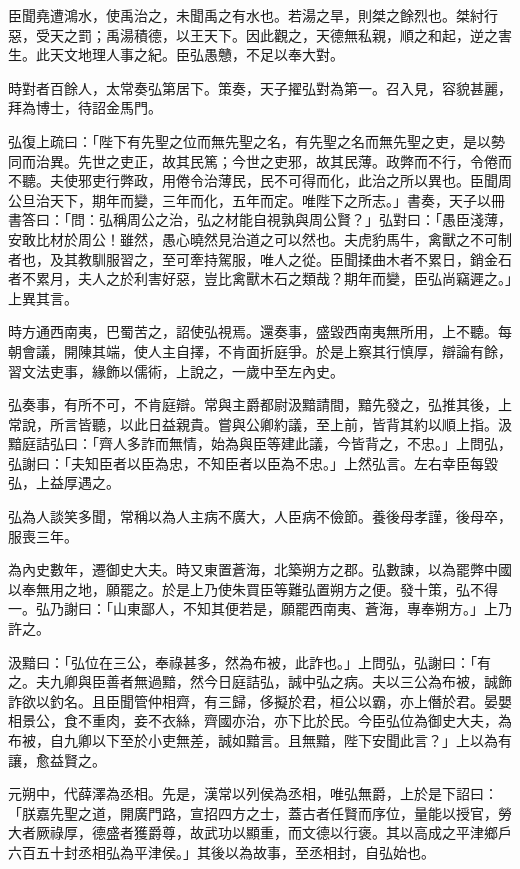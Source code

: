 \begin{pinyinscope}
臣聞堯遭鴻水，使禹治之，未聞禹之有水也。若湯之旱，則桀之餘烈也。桀紂行惡，受天之罰；禹湯積德，以王天下。因此觀之，天德無私親，順之和起，逆之害生。此天文地理人事之紀。臣弘愚戇，不足以奉大對。

時對者百餘人，太常奏弘第居下。策奏，天子擢弘對為第一。召入見，容貌甚麗，拜為博士，待詔金馬門。

弘復上疏曰：「陛下有先聖之位而無先聖之名，有先聖之名而無先聖之吏，是以勢同而治異。先世之吏正，故其民篤；今世之吏邪，故其民薄。政弊而不行，令倦而不聽。夫使邪吏行弊政，用倦令治薄民，民不可得而化，此治之所以異也。臣聞周公旦治天下，期年而變，三年而化，五年而定。唯陛下之所志。」書奏，天子以冊書答曰：「問：弘稱周公之治，弘之材能自視孰與周公賢？」弘對曰：「愚臣淺薄，安敢比材於周公！雖然，愚心曉然見治道之可以然也。夫虎豹馬牛，禽獸之不可制者也，及其教馴服習之，至可牽持駕服，唯人之從。臣聞揉曲木者不累日，銷金石者不累月，夫人之於利害好惡，豈比禽獸木石之類哉？期年而變，臣弘尚竊遲之。」上異其言。

時方通西南夷，巴蜀苦之，詔使弘視焉。還奏事，盛毀西南夷無所用，上不聽。每朝會議，開陳其端，使人主自擇，不肯面折庭爭。於是上察其行慎厚，辯論有餘，習文法吏事，緣飾以儒術，上說之，一歲中至左內史。

弘奏事，有所不可，不肯庭辯。常與主爵都尉汲黯請間，黯先發之，弘推其後，上常說，所言皆聽，以此日益親貴。嘗與公卿約議，至上前，皆背其約以順上指。汲黯庭詰弘曰：「齊人多詐而無情，始為與臣等建此議，今皆背之，不忠。」上問弘，弘謝曰：「夫知臣者以臣為忠，不知臣者以臣為不忠。」上然弘言。左右幸臣每毀弘，上益厚遇之。

弘為人談笑多聞，常稱以為人主病不廣大，人臣病不儉節。養後母孝謹，後母卒，服喪三年。

為內史數年，遷御史大夫。時又東置蒼海，北築朔方之郡。弘數諫，以為罷弊中國以奉無用之地，願罷之。於是上乃使朱買臣等難弘置朔方之便。發十策，弘不得一。弘乃謝曰：「山東鄙人，不知其便若是，願罷西南夷、蒼海，專奉朔方。」上乃許之。

汲黯曰：「弘位在三公，奉祿甚多，然為布被，此詐也。」上問弘，弘謝曰：「有之。夫九卿與臣善者無過黯，然今日庭詰弘，誠中弘之病。夫以三公為布被，誠飾詐欲以釣名。且臣聞管仲相齊，有三歸，侈擬於君，桓公以霸，亦上僭於君。晏嬰相景公，食不重肉，妾不衣絲，齊國亦治，亦下比於民。今臣弘位為御史大夫，為布被，自九卿以下至於小吏無差，誠如黯言。且無黯，陛下安聞此言？」上以為有讓，愈益賢之。

元朔中，代薛澤為丞相。先是，漢常以列侯為丞相，唯弘無爵，上於是下詔曰：「朕嘉先聖之道，開廣門路，宣招四方之士，蓋古者任賢而序位，量能以授官，勞大者厥祿厚，德盛者獲爵尊，故武功以顯重，而文德以行褒。其以高成之平津鄉戶六百五十封丞相弘為平津侯。」其後以為故事，至丞相封，自弘始也。


\end{pinyinscope}
